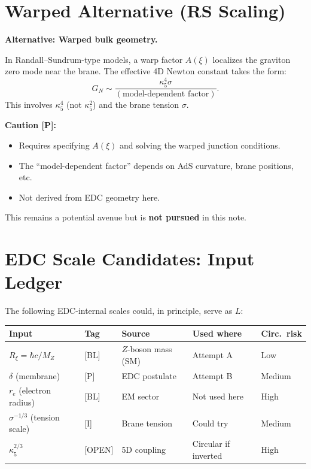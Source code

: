 \documentclass[11pt,a4paper]{article}
\newcommand{\tagBL}{\textcolor{blue!70!black}{[BL]}}
\newcommand{\tagI}{\textcolor{green!50!black}{[I]}}
\newcommand{\tagP}{\textcolor{orange!80!black}{[P]}}
\newcommand{\tagOPEN}{\textcolor{red!70!black}{[OPEN]}}
\begin{document}
\section{Warped Alternative (RS Scaling)}
\label{sec:warped}

\begin{statusbox}
\textbf{Alternative: Warped bulk geometry.}

In Randall--Sundrum-type models, a warp factor $A(\xi)$ localizes the graviton zero mode near the brane.
The effective 4D Newton constant takes the form:
\begin{equation}
    G_N \sim \frac{\kappa_5^4 \sigma}{(\text{model-dependent factor})}.
    \label{eq:GN_RS}
\end{equation}
This involves $\kappa_5^4$ (not $\kappa_5^2$) and the brane tension $\sigma$.

\textbf{Caution \tagP{}:}
\begin{itemize}[nosep]
    \item Requires specifying $A(\xi)$ and solving the warped junction conditions.
    \item The ``model-dependent factor'' depends on AdS curvature, brane positions, etc.
    \item Not derived from EDC geometry here.
\end{itemize}

This remains a potential avenue but is \textbf{not pursued} in this note.
\end{statusbox}

\section{EDC Scale Candidates: Input Ledger}
\label{sec:ledger}

The following EDC-internal scales could, in principle, serve as $L$:

\begin{center}
\renewcommand{\arraystretch}{1.3}
\begin{tabular}{p{2cm}p{1.2cm}p{4cm}p{3cm}p{2cm}}
\toprule
\textbf{Input} & \textbf{Tag} & \textbf{Source} & \textbf{Used where} & \textbf{Circ.\ risk} \\
\midrule
$R_\xi = \hbar c / M_Z$ & \tagBL{} & $Z$-boson mass (SM) & Attempt A & Low \\
$\delta$ (membrane) & \tagP{} & EDC postulate & Attempt B & Medium \\
$r_e$ (electron radius) & \tagBL{} & EM sector & Not used here & High \\
$\sigma^{-1/3}$ (tension scale) & \tagI{} & Brane tension & Could try & Medium \\
$\kappa_5^{2/3}$ & \tagOPEN{} & 5D coupling & Circular if inverted & High \\
\bottomrule
\end{tabular}
\end{center}
\end{document}
